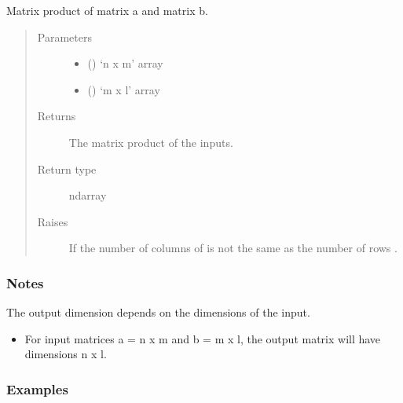 \documentclass[letterpaper,10pt,english]{sphinxmanual}
\begin{document}
\begin{fulllineitems}
Matrix product of matrix a and  matrix b.
\begin{quote}\begin{description}
\item[{Parameters}] \leavevmode\begin{itemize}
\item {} 
 () \textendash{} ‘n x m’ array

\item {} 
 () \textendash{} ‘m x l’ array

\end{itemize}

\item[{Returns}] \leavevmode
{} \textendash{} The matrix product of the inputs.

\item[{Return type}] \leavevmode
ndarray

\item[{Raises}] \leavevmode
{} \textendash{} If the number of columns of  is not the same as
    the number of rows .

\end{description}\end{quote}
\subsubsection*{Notes}

The output dimension depends on the dimensions of the input.
\begin{itemize}
\item {} 
For input matrices a = n x m and b = m x l, the output matrix will have
dimensions n x l.

\end{itemize}
\subsubsection*{Examples}


\end{fulllineitems}
\end{document}
